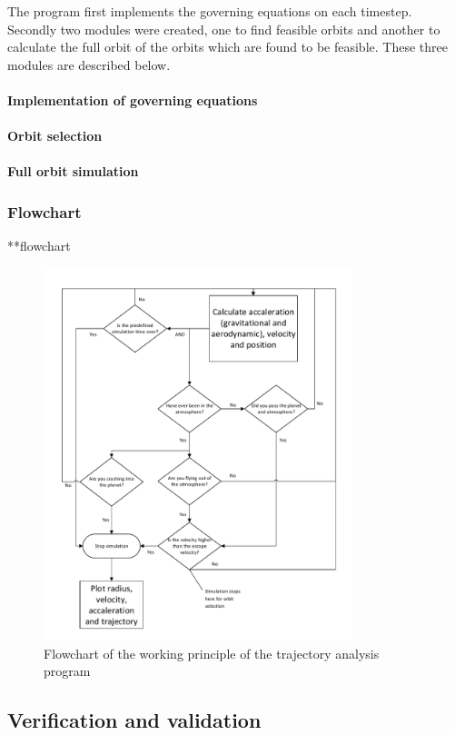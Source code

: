 The program first implements the governing equations on each timestep. Secondly two modules were created, one to find feasible orbits and another to calculate the full orbit of the orbits which are found to be feasible. These three modules are described below.

\paragraph{Implementation of governing equations}

\paragraph{Orbit selection}

\paragraph{Full orbit simulation}

\subsubsection{Flowchart} \label{subsec:flow}
**flowchart

\begin{figure}[H]
\centering
\hspace{-23mm}
\includegraphics[width = 0.8\textwidth]{Figure/astro_tool.pdf}
\vspace{-5mm}
\caption{Flowchart of the working principle of the trajectory analysis program}
\label{fig:traj_flow}
\end{figure}

\subsection{Verification and validation}